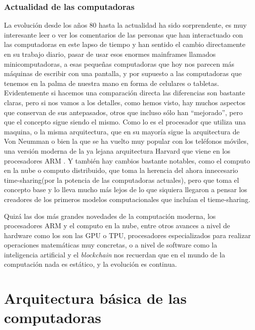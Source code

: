 \documentclass[letterpaper,12pt,oneside]{book}
\begin{document}
		\clearpage		

	
		\subsection{Actualidad de las computadoras}
		
		
		La evolución desde los años 80 hasta la actualidad ha sido sorprendente, es muy interesante leer o ver los comentarios de las personas que han interactuado
		con las computadoras en este lapso de tiempo y han sentido el cambio directamente en su trabajo diario, pasar de usar esos enormes mainframes
		llamados minicomputadoras, a esas pequeñas computadoras que hoy nos parecen más máquinas de escribir con una pantalla, y por supuesto a las 
		computadoras que tenemos en la palma de nuestra mano en forma de celulares o tabletas. Evidentemente si hacemos una comparación directa las diferencias
		son bastante claras, pero si nos vamos a los detalles, como hemos visto, hay muchos aspectos que conservan de sus antepasados, otros que incluso sólo
		han ``mejorado'', pero que el concepto sigue siendo el mismo. Como lo es el procesador que utiliza una maquina, o la misma arquitectura, que en su mayoría sigue la 
		arquitectura de Von Neumman o bien la que se ha vuelto muy popular con los teléfonos móviles, una versión moderna de la ya lejana
		arquitectura Harvard que viene en los procesadores ARM \cite[p. 109]{valvano_introduction_2017}. Y también hay cambios bastante notables, como el computo en la nube o 
		computo distribuido, que toma la 
		herencia del ahora innecesario time-sharing(por la potencia de las computadoras actuales), pero que toma el concepto base y lo lleva mucho más lejos de lo que siquiera 
		llegaron a pensar los creadores de los primeros modelos computacionales que incluían el tieme-sharing.
		
		Quizá las dos más grandes novedades de la computación moderna, los procesadores ARM y el computo en la nube, entre otros avances a nivel de hardware
		como los son las GPU o TPU, procesadores especializados para realizar operaciones matemáticas muy concretas, o a nivel de software como
		la inteligencia artificial y el \textit{blockchain} nos recuerdan que en el mundo de la computación nada es estático, y la evolución es continua.
		 
\clearpage	

\chapter{Arquitectura básica de las computadoras} %
\end{document}
